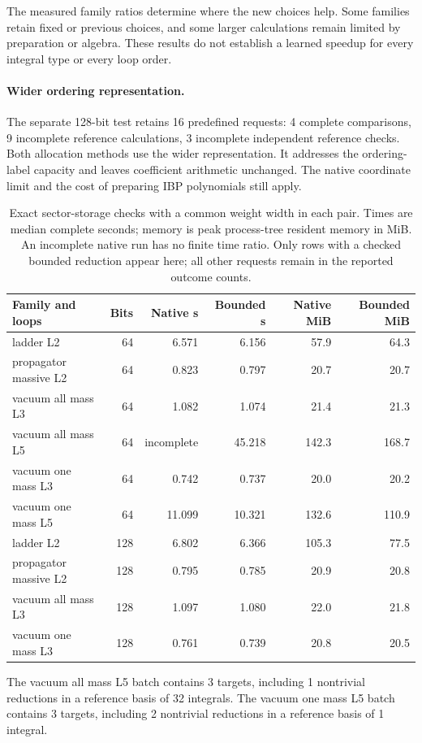 The measured family ratios determine where the new choices help. Some families retain fixed or previous choices, and some larger calculations remain limited by preparation or algebra. These results do not establish a learned speedup for every integral type or every loop order.
\paragraph{Wider ordering representation.} The separate 128-bit test retains 16 predefined requests: 4 complete comparisons, 9 incomplete reference calculations, 3 incomplete independent reference checks. Both allocation methods use the wider representation. It addresses the ordering-label capacity and leaves coefficient arithmetic unchanged. The native coordinate limit and the cost of preparing IBP polynomials still apply.

\begin{table}[!htbp]\centering\small
\caption{Exact sector-storage checks with a common weight width in each pair. Times are median complete seconds; memory is peak process-tree resident memory in MiB. An incomplete native run has no finite time ratio. Only rows with a checked bounded reduction appear here; all other requests remain in the reported outcome counts.}
\begin{tabular}{@{}lrrrrr@{}}\toprule Family and loops & Bits & Native s & Bounded s & Native MiB & Bounded MiB\\\midrule
ladder L2 & 64 & 6.571 & 6.156 & 57.9 & 64.3\\
propagator massive L2 & 64 & 0.823 & 0.797 & 20.7 & 20.7\\
vacuum all mass L3 & 64 & 1.082 & 1.074 & 21.4 & 21.3\\
vacuum all mass L5 & 64 & incomplete & 45.218 & 142.3 & 168.7\\
vacuum one mass L3 & 64 & 0.742 & 0.737 & 20.0 & 20.2\\
vacuum one mass L5 & 64 & 11.099 & 10.321 & 132.6 & 110.9\\
ladder L2 & 128 & 6.802 & 6.366 & 105.3 & 77.5\\
propagator massive L2 & 128 & 0.795 & 0.785 & 20.9 & 20.8\\
vacuum all mass L3 & 128 & 1.097 & 1.080 & 22.0 & 21.8\\
vacuum one mass L3 & 128 & 0.761 & 0.739 & 20.8 & 20.5\\
\bottomrule\end{tabular}\end{table}\FloatBarrier
The vacuum all mass L5 batch contains 3 targets, including 1 nontrivial reductions in a reference basis of 32 integrals.
The vacuum one mass L5 batch contains 3 targets, including 2 nontrivial reductions in a reference basis of 1 integral.
